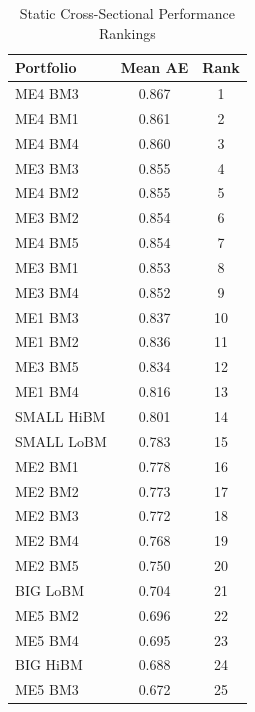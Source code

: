 \begin{table}
\caption{Static Cross-Sectional Performance Rankings}
\label{tab:static_rankings}
\begin{tabular}{lcc}
\toprule
Portfolio & Mean AE & Rank \\
\midrule
ME4 BM3 & 0.867 & 1 \\
ME4 BM1 & 0.861 & 2 \\
ME4 BM4 & 0.860 & 3 \\
ME3 BM3 & 0.855 & 4 \\
ME4 BM2 & 0.855 & 5 \\
ME3 BM2 & 0.854 & 6 \\
ME4 BM5 & 0.854 & 7 \\
ME3 BM1 & 0.853 & 8 \\
ME3 BM4 & 0.852 & 9 \\
ME1 BM3 & 0.837 & 10 \\
ME1 BM2 & 0.836 & 11 \\
ME3 BM5 & 0.834 & 12 \\
ME1 BM4 & 0.816 & 13 \\
SMALL HiBM & 0.801 & 14 \\
SMALL LoBM & 0.783 & 15 \\
ME2 BM1 & 0.778 & 16 \\
ME2 BM2 & 0.773 & 17 \\
ME2 BM3 & 0.772 & 18 \\
ME2 BM4 & 0.768 & 19 \\
ME2 BM5 & 0.750 & 20 \\
BIG LoBM & 0.704 & 21 \\
ME5 BM2 & 0.696 & 22 \\
ME5 BM4 & 0.695 & 23 \\
BIG HiBM & 0.688 & 24 \\
ME5 BM3 & 0.672 & 25 \\
\bottomrule
\end{tabular}
\end{table}
